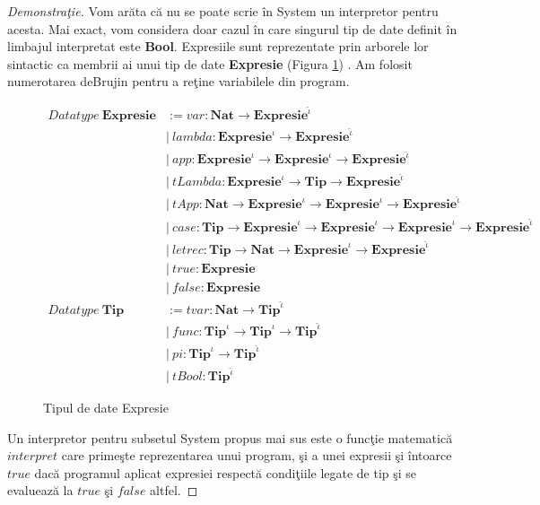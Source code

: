 \begin{proof}[Demonstra\c tie]
Vom ar\u ata c\u a nu se poate scrie \^ in System \fhat un interpretor pentru acesta. Mai exact, vom considera doar cazul \^ in care singurul tip de date definit \^ in limbajul interpretat este \textbf{Bool}. Expresiile sunt reprezentate prin arborele lor sintactic ca membrii ai unui tip de date \textbf{Expresie} (Figura \ref{expresie_datatype}) . Am folosit numerotarea deBrujin pentru a re\c tine variabilele din program.
\begin{figure}
\begin{equation*}
\begin{split}
Datatype\ \textbf{Expresie}
                    &:= var : \textbf{Nat} \to \textbf{Expresie}^{\hat{\iota}}\\
                    &|\ lambda : \textbf{Expresie}^{\iota} \to \textbf{Expresie}^{\hat{\iota}} \\
                    &|\ app : \textbf{Expresie}^{\iota}\to \textbf{Expresie}^{\iota}\to \textbf{Expresie}^{\hat{\iota}}  \\
                    &|\ tLambda : \textbf{Expresie}^{\iota} \to\textbf{Tip} \to \textbf{Expresie}^{\hat{\iota}} \\
                    &|\ tApp : \textbf{Nat} \to \textbf{Expresie}^{\iota}\to \textbf{Expresie}^{\iota}\to \textbf{Expresie}^{\hat{\iota}}  \\
                    &|\ case : \textbf{Tip} \to \textbf{Expresie}^{{\iota}} \to \textbf{Expresie}^{{\iota}}\to \textbf{Expresie}^{{\iota}}\to \textbf{Expresie}^{\hat{\iota}}\\
                    &|\ letrec : \textbf{Tip} \to \textbf{Nat} \to \textbf{Expresie}^{{\iota}} \to \textbf{Expresie}^{\hat{\iota}}\\
                    &|\ true : \textbf{Expresie} \\
                    &|\ false : \textbf{Expresie} \\
Datatype\ \textbf{Tip}
                    &:= tvar   : \textbf{Nat} \to \textbf{Tip}^{\hat{\iota}}\\
                    &|\ func   : \textbf{Tip}^{{\iota}}\to \textbf{Tip}^{{\iota}}\to \textbf{Tip}^{\hat{\iota}}\\
                    &|\ pi     : \textbf{Tip}^{{\iota}}\to \textbf{Tip}^{\hat{\iota}} \\
                    &|\ tBool  : \textbf{Tip}^{\hat{\iota}}
\end{split}
\end{equation*}
\caption{Tipul de date Expresie}
\label{expresie_datatype}
\end{figure}
Un interpretor pentru subsetul System \fhat propus mai sus este o func\c tie matematic\u a $interpret$ care prime\c ste reprezentarea unui program, \c si a unei expresii \c si \^ intoarce $true$ dac\u a programul aplicat expresiei respect\u a condi\c tiile legate de tip \c si se evalueaz\u a la $true$ \c si $false$ altfel.


\end{proof}
